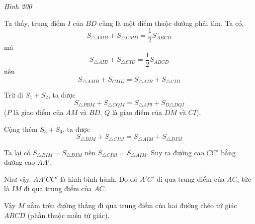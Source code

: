 \begin{bt}
{\begin{enumerate}
\begin{center}
\textit{Hình 200}
	\end{center}	
	
	Ta thấy, trung điểm $I$ của $BD$ cũng là một điểm thuộc đường phải tìm. Ta có, $$ S_{\triangle{AMB}} + S_{\triangle{CMD}} = \dfrac{1}{2}S_{ABCD} $$ mà $$ S_{\triangle{AIB}} + S_{\triangle{CID}} = \dfrac{1}{2}S_{ABCD} $$ nên $$ S_{\triangle{AMB}} + S_{CMD} = S_{\triangle{AIB}} + S_{\triangle{CID}} $$
	
	Trừ đi $S_1 + S_2$, ta được $$ S_{\triangle{PBM}} + S_{\triangle{CQM}} = S_{\triangle{API}} + S_{D\triangle{DQI}} $$ ($P$ là giao điểm của $AM$ và $BD$, $Q$ là giao điểm của $DM$ và $CI$).
	
	Cộng thêm $S_3 + S_4$, ta được $$ S_{\triangle{BIM}} + S_{\triangle{CIM}} = S_{\triangle{AIM}}+ S_{\triangle{DIM}} $$
	
	Ta lại có $ S_{\triangle{BIM}} = S_{\triangle{DIM}} $ nên $ S_{\triangle{CIM}} = S_{\triangle{AIM}} $. Suy ra đường cao $CC'$ bằng đường cao $AA'$.
	
	Như vậy, $AA'CC'$ là hình bình hành. Do đó $A'C'$ đi qua trung điểm của $AC$, tức là $IM$ đi qua trung điểm của $AC$.
	
	Vậy $M$ nằm trên đường thẳng đi qua trung điểm của hai đường chéo tứ giác $ABCD$ (phần thuộc miền tứ giác).
\end{enumerate}
}
	\end{bt}
	
